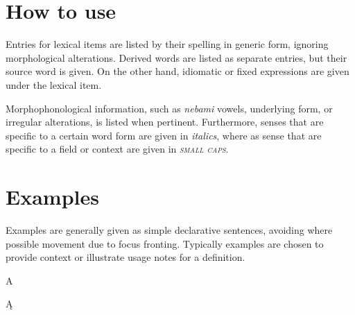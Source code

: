 \section*{How to use}
Entries for lexical items are listed by their spelling in generic form, ignoring morphological alterations. Derived words are listed as separate entries, but their source word is given. On the other hand, idiomatic or fixed expressions are given under the lexical item.

Morphophonological information, such as \emph{nebami} vowels, underlying form, or irregular alterations, is listed when pertinent. Furthermore, senses that are specific to a certain word form are given in \textit{italics}, where as sense that are specific to a field or context are given in \textsc{\textit{small caps}}.

\section*{Examples}
Examples are generally given as simple declarative sentences, avoiding where possible movement due to focus fronting. Typically examples are chosen to provide context or illustrate usage notes for a definition.

\setlength{\columnsep}{30pt}

\begin{dic}{A}
\end{dic}

\begin{dic}{Ą}
\end{dic}

